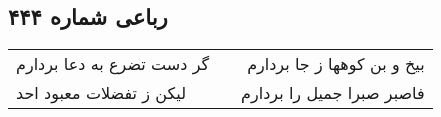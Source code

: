 \begin{center}
\section*{رباعی شماره ۴۴۴}
\label{sec:sh444}
\begin{longtable}{l p{0.5cm} r}
گر دست تضرع به دعا بردارم
&&
بیخ و بن کوهها ز جا بردارم
\\
لیکن ز تفضلات معبود احد
&&
فاصبر صبرا جمیل را بردارم
\\
\end{longtable}
\end{center}

